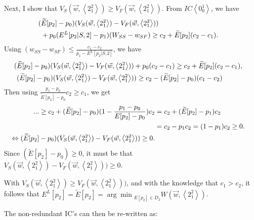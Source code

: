 \documentclass[11pt]{article} %
\theoremstyle{exampstyle}
\newcommand{\eq}[1]{\begin{align}#1\end{align}}
\newcommand{\la}{ \left < }
\newcommand{\ra}{ \right > }
\newcommand{\wtE}{ \widetilde{E}}
\begin{document}
Next, I show that $V_S(\vec{w},\la 2^2_1\ra) \ge V_F(\vec{w},\la 2^2_1\ra)$. From  $IC \la 0^1_0 \ra$, we have
\eq{ (& \wtE[p_2]-p_0)(V_S(\vec{w},\la 2^2_1\ra)-V_F(\vec{w},\la 2^2_1\ra)) \notag \\
 &+ p_0(E^L[p_2|S,2] -p_1)(W_{SS}-w_{SF}) \ge c_2 +\wtE[p_2](c_2-c_1). \notag
}
Using $(w_{SS}-w_{SF}) \le \frac{c_1-c_2}{p_1 - E^L[p_2 | S,2]}$, we have
\eq{ (& \wtE[p_2]-p_0)(V_S(\vec{w},\la 2^2_1\ra)-V_F(\vec{w},\la 2^2_1\ra)) + p_0(c_2-c_1) \ge c_2 +\wtE[p_2](c_2-c_1), \notag \\
 &(\wtE[p_2]-p_0)(V_S(\vec{w},\la 2^2_1\ra)-V_F(\vec{w},\la 2^2_1\ra)) \ge c_2 -(\wtE[p_2]-p_0)(c_1-c_2) \notag
}
Then using $\frac{p_1-p_0}{\wtE[p_2]-p_0}c_2 \ge c_1$, we get
\eq{
... \ge c_2+ (\wtE[p_2]-p_0)(1-\frac{p_1-p_0}{E[p_2]-p_0})c_2&= c_2 + (\wtE[p_2]-p_1)c_2\notag \\
&= c_2 -p_1c_2 =(1-p_1)c_2 \ge 0. \notag \\
\Leftrightarrow (\wtE[p_2]-p_0)(V_S(\vec{w},\la 2^2_1\ra)-V_F(\vec{w},\la 2^2_1\ra))  \ge 0. \notag
}
Since $(\wtE[p_2]-p_0) \ge 0$, it must be that $V_S(\vec{w},\la 2^2_1\ra)-V_F(\vec{w},\la 2^2_1\ra)) \ge 0.$


With $V_S(\vec{w},\la 2^2_1\ra) \ge V_F(\vec{w},\la 2^2_1\ra))$, and with the knowledge that $c_1 > c_2$, it follows that $E^L[p_2]=\wtE[p_2]= {\arg\min}_{E[p_2] \in D_2} W(\vec{w},\la 2^2_1 \ra)$.

The non-redundant IC's can then be re-written as:
\end{document}
